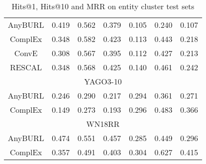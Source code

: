 \begin{table}[H]
\begin{tabular}{crrrrrr}
\multicolumn{1}{c|}{AnyBURL} & 0.419 & 0.562 & \multicolumn{1}{r|}{0.379} & 0.105 & 0.240 & 0.107 \\
\multicolumn{1}{c|}{ComplEx} & 0.348 & 0.582 & \multicolumn{1}{r|}{0.423} & 0.113 & 0.443 & 0.218 \\
\multicolumn{1}{c|}{ConvE} & 0.308 & 0.567 & \multicolumn{1}{r|}{0.395} & 0.112 & 0.427 & 0.213 \\
\multicolumn{1}{c|}{RESCAL} & 0.348 & 0.568 & \multicolumn{1}{r|}{0.425} & 0.140 & 0.461 & 0.242 \\ \hline
\multicolumn{7}{|c|}{YAGO3-10} \\ \hline
\multicolumn{1}{c|}{AnyBURL} & 0.246 & 0.290 & \multicolumn{1}{r|}{0.217} & 0.294 & 0.361 & 0.271 \\
\multicolumn{1}{c|}{ComplEx} & 0.149 & 0.273 & \multicolumn{1}{r|}{0.193} & 0.296 & 0.483 & 0.366 \\ \hline
\multicolumn{7}{|c|}{WN18RR} \\ \hline
\multicolumn{1}{c|}{AnyBURL} & 0.474 & 0.551 & \multicolumn{1}{r|}{0.457} & 0.285 & 0.449 & 0.296 \\
\multicolumn{1}{c|}{ComplEx} & 0.357 & 0.491 & \multicolumn{1}{r|}{0.403} & 0.304 & 0.627 & 0.415
\end{tabular}
\caption{Hits@1, Hits@10 and MRR on entity cluster test sets}
\label{tab:testsets_entity_cluster_metrics}
\end{table}
